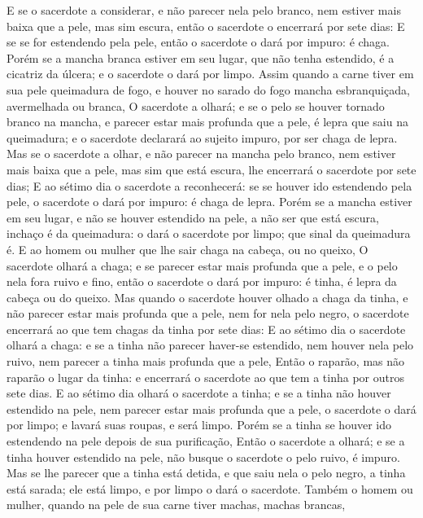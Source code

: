 {{  E se o sacerdote a considerar, e não parecer nela pelo branco, nem estiver mais baixa que a pele, mas sim escura, então o sacerdote o encerrará por sete dias:
  E se se for estendendo pela pele, então o sacerdote o dará por impuro: é chaga.
  Porém se a mancha branca estiver em seu lugar, que não tenha estendido, é a cicatriz da úlcera; e o sacerdote o dará por limpo.
  Assim quando a carne tiver em sua pele queimadura de fogo, e houver no sarado do fogo mancha esbranquiçada, avermelhada ou branca,
  O sacerdote a olhará; e se o pelo se houver tornado branco na mancha, e parecer estar mais profunda que a pele, é lepra que saiu na queimadura; e o sacerdote declarará ao sujeito impuro, por ser chaga de lepra.
  Mas se o sacerdote a olhar, e não parecer na mancha pelo branco, nem estiver mais baixa que a pele, mas sim que está escura, lhe encerrará o sacerdote por sete dias;
  E ao sétimo dia o sacerdote a reconhecerá: se se houver ido estendendo pela pele, o sacerdote o dará por impuro: é chaga de lepra.
  Porém se a mancha estiver em seu lugar, e não se houver estendido na pele, a não ser que está escura, inchaço é da queimadura: o dará o sacerdote por limpo; que sinal da queimadura é.
  E ao homem ou mulher que lhe sair chaga na cabeça, ou no queixo,
  O sacerdote olhará a chaga; e se parecer estar mais profunda que a pele, e o pelo nela fora ruivo e fino, então o sacerdote o dará por impuro: é tinha, é lepra da cabeça ou do queixo.
  Mas quando o sacerdote houver olhado a chaga da tinha, e não parecer estar mais profunda que a pele, nem for nela pelo negro, o sacerdote encerrará ao que tem chagas da tinha por sete dias:
  E ao sétimo dia o sacerdote olhará a chaga: e se a tinha não parecer haver-se estendido, nem houver nela pelo ruivo, nem parecer a tinha mais profunda que a pele,
  Então o raparão, mas não raparão o lugar da tinha: e encerrará o sacerdote ao que tem a tinha por outros sete dias.
  E ao sétimo dia olhará o sacerdote a tinha; e se a tinha não houver estendido na pele, nem parecer estar mais profunda que a pele, o sacerdote o dará por limpo; e lavará suas roupas, e será limpo.
  Porém se a tinha se houver ido estendendo na pele depois de sua purificação,
  Então o sacerdote a olhará; e se a tinha houver estendido na pele, não busque o sacerdote o pelo ruivo, é impuro.
  Mas se lhe parecer que a tinha está detida, e que saiu nela o pelo negro, a tinha está sarada; ele está limpo, e por limpo o dará o sacerdote.
  Também o homem ou mulher, quando na pele de sua carne tiver machas, machas brancas,
}}
